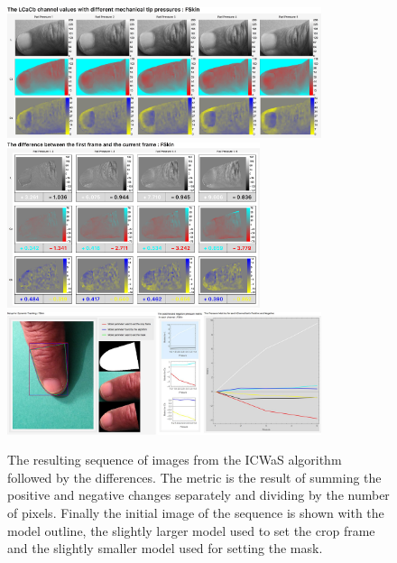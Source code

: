 \begin{figure}[h!]
  \centering
    \includegraphics[width=0.820\textwidth]{Chapter4/Figs/Final_Fig_Channels_FSkin.jpg}
    \includegraphics[width=0.660\textwidth]{Chapter4/Figs/Final_Fig_Total_Difference_FSkin.jpg}
    \includegraphics[width=0.820\textwidth]{Chapter4/Figs/Final_Fig_Misc_FSkin.jpg}
        \caption{The resulting sequence of images from the ICWaS algorithm followed by the differences. The metric is the result of summing the positive and negative changes separately and dividing by the number of pixels. Finally the initial image of the sequence is shown with the model outline, the slightly larger model used to set the crop frame and the slightly smaller model used for setting the mask.}\label{fig:ICWaSResultFSkin}
\end{figure}



